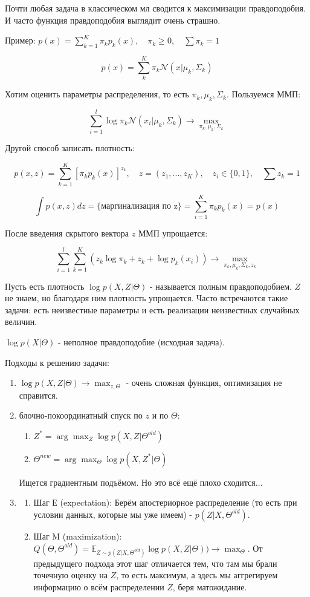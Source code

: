 \documentclass[12pt]{article}
\begin{document}
Почти любая задача в классическом мл сводится к максимизации правдоподобия. И часто функция правдоподобия выглядит очень страшно.

Пример: $p(x) = \sum_{k=1}^K \pi_k p_k(x), \quad \pi_k \geq 0, \quad \sum \pi_k = 1$

\[ p(x) = \sum_k^K \pi_k  \mathcal{N}(x|\mu_k, \Sigma_k) \]

Хотим оценить параметры распределения, то есть $\pi_k, \mu_k, \Sigma_k$. Пользуемся ММП:

\[ \sum_{i=1}^l \log \pi_k \mathcal{N}(x_i|\mu_k, \Sigma_k) \rightarrow \max_{\pi_k, \mu_k, \Sigma_k}\]

Другой способ записать плотность: 

\[ p(x, z) = \sum_{k=1}^K [\pi_k p_k(x)]^{z_k}, \quad z = (z_1, ..., z_K), \quad z_i \in \{ 0, 1 \}, \quad \sum z_k = 1 \]

\[ \int p(x, z) dz = \{ \text{маргинализация по z} \} = \sum_{i=1}^K \pi_k p_k(x) = p(x)\]

После введения скрытого вектора $z$ ММП упрощается:

\[ \sum_{i=1}^l \sum_{k=1}^K (z_k \log \pi_k + z_k + \log p_k(x_i)) \rightarrow \max_{\pi_k, \mu_k, \Sigma_k, z_k}\]

Пусть есть плотность $\log p(X, Z | \Theta)$ - называется полным правдоподобием. $Z$ не знаем, но благодаря ним плотность упрощается. Часто встречаются такие задачи: есть неизвестные параметры и есть реализации неизвестных случайных величин.

$\log p(X|\Theta)$ - неполное правдоподобие (исходная задача).

Подходы к решению задачи:
\begin{enumerate}
    \item $\log p(X, Z | \Theta) \rightarrow \max_{z, \Theta}
$ - очень сложная функция, оптимизация не справится.
    \item  блочно-покоординатный спуск по $z$ и по $\Theta$:
    \begin{enumerate}
        \item $Z^* = \arg \max_Z \log p(X,Z|\Theta^{old})$
        \item $\Theta^{new} = \arg \max_\Theta \log p(X, Z^* | \Theta)$
    \end{enumerate}

    Ищется градиентным подъёмом. Но это всё ещё плохо сходится... 

    \item 
    
    \begin{enumerate}
        \item Шаг Е (expectation):
        Берём апостериорное распределение (то есть при условии данных, которые мы уже имеем) - $p(Z|X, \Theta^{old})$.
        \item Шаг M (maximization):
        $Q(\Theta, \Theta^{old}) = \mathbb{E}_{Z \sim p(Z|X, \Theta^{old})} \log p(X, Z|\Theta)) \rightarrow \max_\Theta$. От предыдущего подхода этот шаг отличается тем, что там мы брали точечную оценку на $Z$, то есть максимум, а здесь мы аггрегируем информацию о всём распределении $Z$, беря матожидание.
    \end{enumerate}
\end{enumerate}
\end{document}
